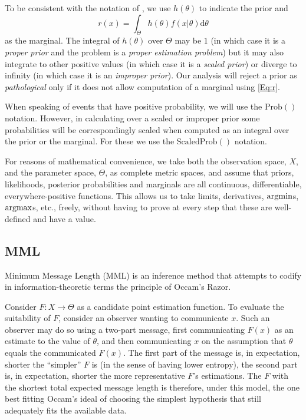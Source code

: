 \documentclass{IEEEtran}
\newcommand{\citet}[1]{\cite{#1}}
\newcommand{\citep}[1]{\cite{#1}}
\newcommand{\argmax}{\operatornamewithlimits{argmax}}
\newcommand{\argmin}{\operatornamewithlimits{argmin}}
\newcommand{\defeq}{\stackrel{\text{def}}{=}}
\begin{document}
To be consistent with the notation of \citet{Wallace2005}, we use
$h(\theta)$ to indicate the prior and
\begin{equation}\label{Eq:r}
r(x)=\int_\Theta h(\theta)f(x|\theta)\text{d}\theta
\end{equation}
as the marginal.
The integral of $h(\theta)$ over $\Theta$ may be $1$ (in which case it is
a \emph{proper prior} and the problem is a \emph{proper estimation problem})
but it may also integrate to other positive values (in which case it is a
\emph{scaled prior}) or diverge to infinity (in which case it is an
\emph{improper prior}).
Our analysis will reject a prior as \emph{pathological} only
if it does not allow computation of a marginal using \eqref{Eq:r}.

When speaking of events that have positive probability, we will use the
$\text{Prob}()$ notation. However, in calculating over a scaled or
improper prior some probabilities will be correspondingly scaled when computed
as an integral over the prior or the marginal. For these
we use the $\text{ScaledProb}()$ notation.

For reasons of mathematical convenience, we take both the observation space,
$X$, and the parameter space, $\Theta$, as complete metric spaces, and
assume that priors, likelihoods, posterior probabilities and marginals
are all continuous, differentiable, everywhere-positive functions.
This allows us to take limits,
derivatives, $\argmin$s, $\argmax$s, etc., freely, without having to
prove at every step that these are well-defined and have a value.

\subsection{MML}\label{SS:smml}

Minimum Message Length (MML) \citep{Wallace2005}
is an inference method that attempts to codify in information-theoretic terms
the principle of Occam's Razor.

Consider $F:X\to\Theta$ as a candidate point estimation function. To
evaluate the suitability of $F$, consider
an observer wanting to communicate $x$. Such an observer may do so
using a two-part message,
first communicating $F(x)$ as an estimate to the value of $\theta$, 
and then communicating $x$ on the assumption that $\theta$ equals the
communicated $F(x)$. The first part of the message is, in expectation,
shorter the ``simpler'' $F$ is (in the sense of having lower entropy),
the second part is, in expectation, shorter the more representative $F$'s
estimations. The $F$
with the shortest total expected message length is therefore, under this model,
the one best fitting Occam's ideal of choosing the simplest hypothesis
that still adequately fits the available data.
\end{document}
